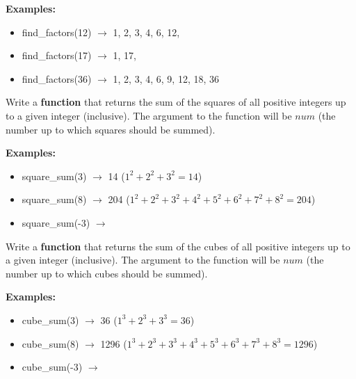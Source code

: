 		\textbf{Examples:}		
		\begin{itemize}
			\item  find\_factors(12) $\rightarrow$ 1, 2, 3, 4, 6, 12, 
			\item  find\_factors(17) $\rightarrow$ 1, 17,
			\item  find\_factors(36) $\rightarrow$ 1, 2, 3, 4, 6, 9, 12, 18, 36
		\end{itemize}



	\item 
		Write a \textbf{function} that returns the sum of the squares of all positive integers up to a given integer (inclusive). The
		argument to the function will be $num$ (the number up to which squares should be summed).
 
		\textbf{Examples:}		
		\begin{itemize}
			\item  square\_sum(3) $\rightarrow$ 14 ($1^2 + 2^2 + 3^2 = 14$)
			\item  square\_sum(8) $\rightarrow$ 204 ($1^2+2^2+3^2+4^2+5^2+6^2+7^2+8^2=204$)
			\item  square\_sum(-3) $\rightarrow$ 
		\end{itemize}


	\item 
		Write a \textbf{function} that returns the sum of the cubes of all positive integers up to a given integer (inclusive). The
		argument to the function will be $num$ (the number up to which cubes should be summed).

		\textbf{Examples:}		
		\begin{itemize}
			\item  cube\_sum(3) $\rightarrow$ 36 ($1^3 + 2^3 + 3^3 = 36$)
			\item  cube\_sum(8) $\rightarrow$ 1296 ($1^3+2^3+3^3+4^3+5^3+6^3+7^3+8^3=1296$)
			\item  cube\_sum(-3) $\rightarrow$ 
		\end{itemize}



